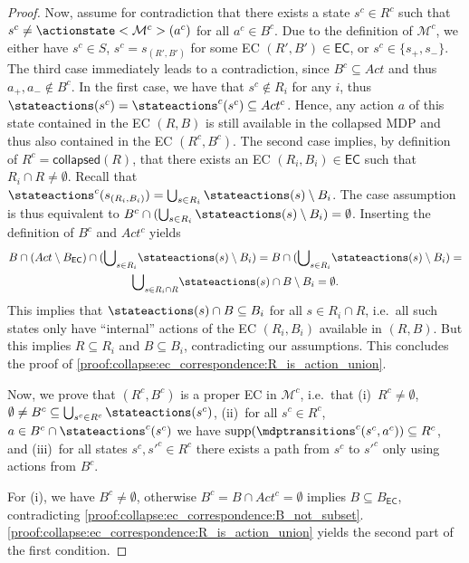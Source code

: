 \documentclass{theoretics}
\newcommand{\intersectionSym}{\cap}
\newcommand{\intersectionBin}{\mathbin{\intersectionSym}}
\newcommand{\UnionSym}{\bigcup}
\newcommand{\intersection}{\intersectionBin}
\newcommand{\Union}{\UnionSym}
\newcommand{\MDP}{\mathcal{M}}
\newcommand{\States}{S}
\newcommand{\Actions}{Act}
\DeclareMathOperator{\support}{supp}
\newcommand{\targetstate}{s_+}
\newcommand{\sinkstate}{s_-}
\newcommand{\eccollapsed}{\mathsf{collapsed}}
\newcommand{\algoecs}{\mathsf{EC}}
\begin{document}
\begin{proof}
	Now, assume for contradiction that there exists a state $s^c \in R^c$ such that $s^c \neq \actionstate<\MDP^c>(a^c)$ for all $a^c \in B^c$.
	Due to the definition of $\MDP^c$, we either have $s^c \in \States$, $s^c = s_{(R', B')}$ for some EC $(R', B') \in \algoecs$, or $s^c \in \{\targetstate, \sinkstate\}$.
	The third case immediately leads to a contradiction, since $B^c \subseteq \Actions$ and thus $a_+, a_- \notin B^c$.
	In the first case, we have that $s^c \notin R_i$ for any $i$, thus $\stateactions(s^c) = \stateactions^c(s^c) \subseteq \Actions^c$.
	Hence, any action $a$ of this state contained in the EC $(R, B)$ is still available in the collapsed MDP and thus also contained in the EC $(R^c, B^c)$.
	The second case implies, by definition of $R^c = \eccollapsed(R)$, that there exists an EC $(R_i, B_i) \in \algoecs$ such that $R_i \intersection R \neq \emptyset$.
	Recall that $\stateactions^c(s_{(R_i, B_i)}) = \Union_{s \in R_i} \stateactions(s) \setminus B_i$.
	The case assumption is thus equivalent to $B^c \intersection (\Union_{s \in R_i} \stateactions(s) \setminus B_i) = \emptyset$.
	Inserting the definition of $B^c$ and $\Actions^c$ yields
	\begin{multline*}
		B \intersection (\Actions \setminus B_{\algoecs}) \intersection ({\Union}_{s \in R_i} \stateactions(s) \setminus B_i) = B \intersection ({\Union}_{s \in R_i} \stateactions(s) \setminus B_i) = \\
		{\Union}_{s \in R_i \intersection R} \stateactions(s) \intersection B \setminus B_i = \emptyset.
	\end{multline*}
	This implies that $\stateactions(s) \intersection B \subseteq B_i$ for all $s \in R_i \intersection R$, i.e.\ all such states only have \enquote{internal} actions of the EC $(R_i, B_i)$ available in $(R, B)$.
	But this implies $R \subseteq R_i$ and $B \subseteq B_i$, contradicting our assumptions.
	This concludes the proof of \ref{proof:collapse:ec_correspondence:R_is_action_union}.

	Now, we prove that $(R^c, B^c)$ is a proper EC in $\MDP^c$, i.e.\ that (i)~$R^c \neq \emptyset$, $\emptyset \neq B^c \subseteq \Union_{s^c \in R^c} \stateactions(s^c)$, (ii)~for all $s^c \in R^c$, $a \in B^c \intersection \stateactions^c(s^c)$ we have $\support(\mdptransitions^c(s^c, a^c)) \subseteq R^c$, and (iii)~for all states $s^c, s'^c \in R^c$ there exists a path from $s^c$ to $s'^c$ only using actions from $B^c$.

	For (i), we have $B^c \neq \emptyset$, otherwise $B^c = B \intersection \Actions^c = \emptyset$ implies $B \subseteq B_{\algoecs}$, contradicting \ref{proof:collapse:ec_correspondence:B_not_subset}.
	\ref{proof:collapse:ec_correspondence:R_is_action_union} yields the second part of the first condition.


\end{proof}
\end{document}
